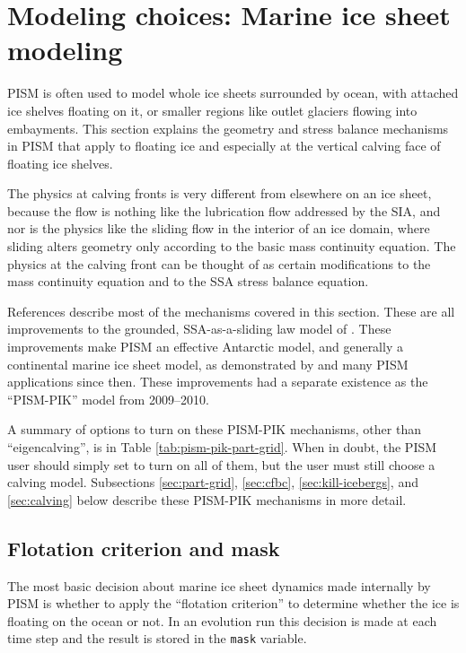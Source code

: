 
\section{Modeling choices: Marine ice sheet modeling}
\label{sec:pism-pik}

PISM is often used to model whole ice sheets surrounded by ocean, with attached ice shelves floating on it, or smaller regions like outlet glaciers flowing into embayments.  This section explains the geometry and stress balance mechanisms in PISM that apply to floating ice and especially at the vertical calving face of floating ice shelves.

The physics at calving fronts is very different from elsewhere on an ice sheet, because the flow is nothing like the lubrication flow addressed by the SIA, and nor is the physics like the sliding flow in the interior of an ice domain, where sliding alters geometry only according to the basic mass continuity equation.  The physics at the calving front can be thought of as certain modifications to the mass continuity equation and to the SSA stress balance equation.

References \cite{Albrechtetal2011,Levermannetal2012,Winkelmannetal2011} describe most of the mechanisms covered in this section.  These are all improvements to the grounded, SSA-as-a-sliding law model of \cite{BBssasliding}.  These improvements make PISM an effective Antarctic model, and generally a continental marine ice sheet model, as demonstrated by \cite{Martinetal2011} and many PISM applications since then.  These improvements had a separate existence as the ``PISM-PIK'' model from 2009--2010.

A summary of options to turn on these PISM-PIK mechanisms, other than ``eigencalving'', is in Table \ref{tab:pism-pik-part-grid}.  When in doubt, the PISM user should simply set  to turn on all of them, but the user must still choose a calving model.  Subsections \ref{sec:part-grid}, \ref{sec:cfbc},  \ref{sec:kill-icebergs}, and \ref{sec:calving} below describe these PISM-PIK mechanisms in more detail.


\subsection{Flotation criterion and mask}
\label{sec:floatmask}

The most basic decision about marine ice sheet dynamics made internally by PISM is whether to apply the ``flotation criterion'' to determine whether the ice is floating on the ocean or not.  In an evolution run this decision is made at each time step and the result is stored in the \texttt{mask} variable.

